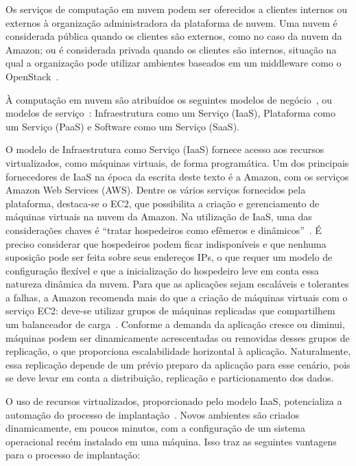 Os serviços de computação em nuvem podem ser oferecidos a clientes internos ou externos à organização administradora da plataforma de nuvem. Uma nuvem é considerada pública quando os clientes são externos, como no caso da nuvem da Amazon; ou é considerada privada quando os clientes são internos,  situação na qual a organização pode utilizar ambientes baseados em um middleware como o OpenStack~\cite{Zhang2010Cloud}.

À computação em nuvem são atribuídos os seguintes modelos de negócio~\cite{Zhang2010Cloud}, ou modelos de serviço~\cite{Nist2011Cloud}: Infraestrutura como um Serviço (IaaS), Plataforma como um Serviço (PaaS) e Software como um Serviço (SaaS). 

O modelo de Infraestrutura como Serviço (IaaS) fornece acesso aos recursos virtualizados, como máquinas virtuais, de forma programática. Um dos principais fornecedores de IaaS na época da escrita deste texto é a Amazon, com os serviços Amazon Web Services (AWS). Dentre os vários serviços fornecidos pela plataforma, destaca-se o EC2, que possibilita a criação e gerenciamento de máquinas virtuais na nuvem da Amazon. Na utilização de IaaS, uma das considerações chaves é ``tratar hospedeiros como efêmeros e dinâmicos''~\cite{Amazon2012Practices}. É preciso considerar que hospedeiros podem ficar indisponíveis e que nenhuma suposição pode ser feita sobre seus endereços IPs, o que requer um modelo de configuração flexível e que a inicialização do hospedeiro leve em conta essa natureza dinâmica da nuvem. Para que as aplicações sejam escaláveis e tolerantes a falhas, a Amazon recomenda mais do que a criação de máquinas virtuais com o serviço EC2: deve-se utilizar grupos de máquinas replicadas que compartilhem um balanceador de carga~\cite{Amazon2012Practices}. Conforme a demanda da aplicação cresce ou diminui, máquinas podem ser dinamicamente acrescentadas ou removidas desses grupos de replicação, o que proporciona escalabilidade horizontal à aplicação. Naturalmente, essa replicação depende de um prévio preparo da aplicação para esse cenário, pois se deve levar em conta a distribuição, replicação e particionamento dos dados. 

O uso de recursos virtualizados, proporcionado pelo modelo IaaS,
potencializa a automação do processo de implantação~\cite{Humble2011Continuous}.
Novos ambientes são criados dinamicamente, em poucos minutos,
com a configuração de um sistema operacional recém instalado em uma máquina.
Isso traz as seguintes vantagens para o processo de implantação:

